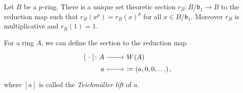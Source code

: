 \begin{lem}\label{pRingSection}
	Let $B$ be a $p$-ring.
	There is a unique set theoretic section
	$r_B\colon B/\mathfrak{b}_1 \to B$
	to the reduction map such that
	$r_B(x^p) = r_B(x)^p$
	for all $x \in B/\mathfrak{b}_1$.
	Moreover $r_B$ is multiplicative and $r_B(1) = 1$.
\end{lem} 


\begin{defn}
	For a ring $A$, we can define the section to the reduction map
	\begin{equation*}
	\begin{tikzcd}[row sep = 0ex
		,/tikz/column 1/.append style={anchor=base east}
		,/tikz/column 2/.append style={anchor=base west}]
		[\ \cdot \ ]\colon A \arrow[r, "", rightarrow] &
		W(A) \\
		a \arrow[r, "", mapsto] &
		[a] \coloneqq \left( a, 0, 0, \ldots \right)
	,\end{tikzcd}
	\end{equation*} 
	where $[a]$ is called the {\em Teichmüller lift} of $a$.
\end{defn}


